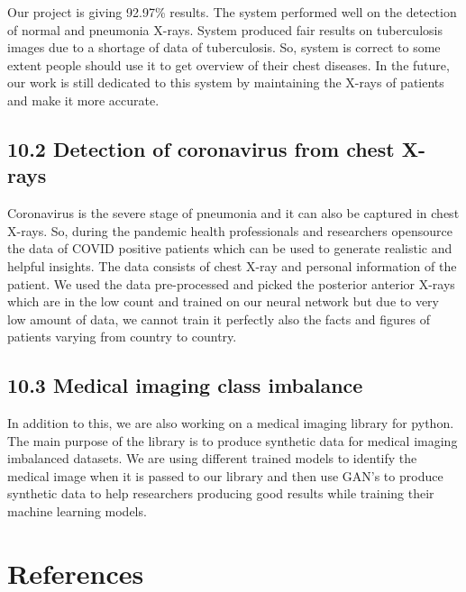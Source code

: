 \documentclass{article} %
\begin{document}
\noindent Our project is giving 92.97\% results. The system performed well on the detection of normal and pneumonia X-rays. System produced fair results on tuberculosis images due to a shortage of data of tuberculosis. So, system is correct to some extent people should use it to get overview of their chest diseases. In the future, our work is still dedicated to this system by maintaining the X-rays of patients and make it more accurate.

\noindent 
\subsection{10.2 Detection of coronavirus from chest X-rays}

\noindent Coronavirus is the severe stage of pneumonia and it can also be captured in chest X-rays. So, during the pandemic health professionals and researchers opensource the data of COVID positive patients which can be used to generate realistic and helpful insights. The data consists of chest X-ray and personal information of the patient. We used the data pre-processed and picked the posterior anterior X-rays which are in the low count and trained on our neural network but due to very low amount of data, we cannot train it perfectly also the facts and figures of patients varying from country to country.

\noindent 
\subsection{10.3 Medical imaging class imbalance  }

\noindent In addition to this, we are also working on a medical imaging library for python. The main purpose of the library is to produce synthetic data for medical imaging imbalanced datasets. We are using different trained models to identify the medical image when it is passed to our library and then use GAN's to produce synthetic data to help researchers producing good results while training their machine learning models.

\noindent \eject 

\noindent 
\section{References}
\end{document}
